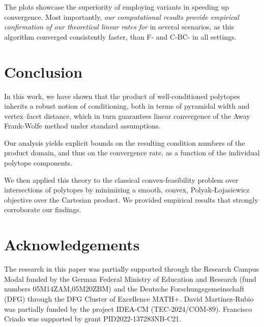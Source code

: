 \documentclass[twoside]{article}
\begin{document}
The plots showcase the superiority of
employing \AFW{} variants in speeding up convergence.
Most importantly, \emph{our computational results provide empirical confirmation of our theoretical linear rates for \AFW{}} in several scenarios, as this algorithm converged  consistently faster, than F-\FW{}
and C-BC-\FW{} in all settings.%

\section{Conclusion}

In this work, we have shown that the product of well‐conditioned polytopes inherits a robust notion of conditioning, both in terms of pyramidal width and vertex–facet distance, which in turn guarantees linear convergence of the Away Frank-Wolfe method under standard assumptions.

Our analysis yields explicit bounds on the resulting condition numbers of the product domain, and thus on the convergence rate, as a function of the individual polytope components.

We then applied this theory to the classical convex-feasibility problem over intersections of polytopes by minimizing a smooth, convex, Polyak-Łojasiewicz objective over the Cartesian product. We provided empirical results that strongly corroborate our findings.

\section*{Acknowledgements}
The research in this paper was partially supported through the Research Campus Modal funded by the German Federal Ministry of Education and Research (fund numbers 05M14ZAM,05M20ZBM) and the Deutsche Forschungsgemeinschaft (DFG) through the DFG Cluster of Excellence MATH+.
David Martínez-Rubio was partially funded by the project IDEA-CM (TEC-2024/COM-89).
Francisco Criado was supported by grant PID2022-137283NB-C21.


\clearpage
\printbibliography[heading=bibintoc] %


%
\end{document}
